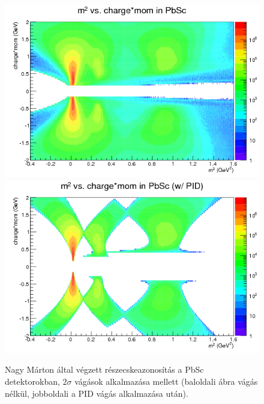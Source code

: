 \documentclass[11pt,a4paper]{article}
\numberwithin{equation}{subsection}
\numberwithin{figure}{section}
\begin{document}
\begin{figure}[H]
\centering
\includegraphics[scale=0.39]{pic/dat/nm/h_m2sum_pbsc_all.png}
\includegraphics[scale=0.39]{pic/dat/nm/h_m2sum_pbsc_pid.png}
\caption{Nagy Márton által végzett részecskeazonosítás a PbSc detektorokban, $2\sigma$ vágások alkalmazása mellett (baloldali ábra vágás nélkül, jobboldali a PID vágás alkalmazása után).}
\label{fig:m2sum1}
\end{figure}
\end{document}
